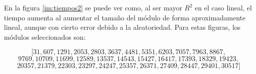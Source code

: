 En la figura \autoref{im:tiempos2} se puede ver como, al ser mayor $R^{2}$ en el caso lineal, el tiempo aumenta al aumentar el tamaño del módulo de forma aproximadamente lineal, aunque con cierto error debido a la aleatoriedad. Para estas figuras, los módulos seleccionados son:

$$[31, 607, 1291, 2053, 2803, 3637, 4481, 5351, 6203, 7057, 7963, 8867,$$
$$9769, 10709, 11699, 12589, 13537, 14543, 15427, 16417, 17393, 18329, 19423,$$
$$20357, 21379, 22303, 23297, 24247, 25357, 26371, 27409, 28447, 29401, 30517]$$
